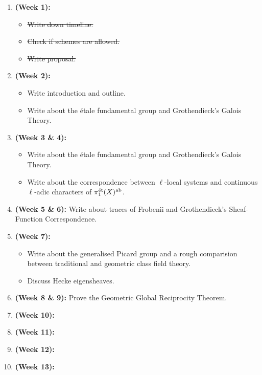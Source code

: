 	\begin{enumerate}
	    \item \textbf{(Week 1):} 
	        \begin{itemize}
	            \item \st{Write down timeline.}
	            \item \st{Check if schemes are allowed.}
	            \item \st{Write proposal.}
	        \end{itemize}
	    \item \textbf{(Week 2):} 
	        \begin{itemize}
	            \item Write introduction and outline.
	            \item Write about the \'etale fundamental group and Grothendieck's Galois Theory.
	        \end{itemize}
	    \item \textbf{(Week 3 \& 4):} 
	        \begin{itemize}
	            \item Write about the \'etale fundamental group and Grothendieck's Galois Theory.
	            \item Write about the correspondence between $\ell$-local systems and continuous $\ell$-adic characters of $\pi_1^{\mathrm{\acute{e}t}}(X)^{\mathrm{ab}}$. 
	        \end{itemize}
	    \item \textbf{(Week 5 \& 6):} Write about traces of Frobenii and Grothendieck's Sheaf-Function Correspondence.
	    \item \textbf{(Week 7):}
	        \begin{itemize}
	            \item Write about the generalised Picard group and a rough comparision between traditional and geometric class field theory.
	            \item Discuss Hecke eigensheaves.
	        \end{itemize}
	    \item \textbf{(Week 8 \& 9):} Prove the Geometric Global Reciprocity Theorem.
	    \item \textbf{(Week 10):}
	    \item \textbf{(Week 11):}
	    \item \textbf{(Week 12):}
	    \item \textbf{(Week 13):}
	\end{enumerate}
	

